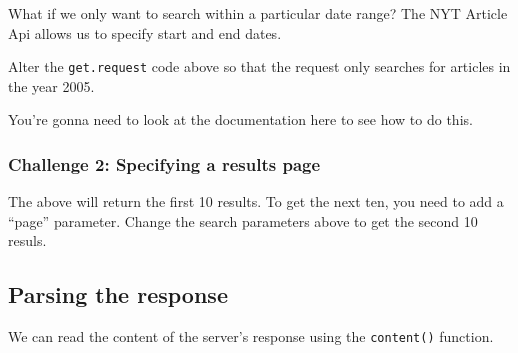 \documentclass[]{book}
\begin{document}
What if we only want to search within a particular date range? The NYT Article Api allows us to specify start and end dates.

Alter the \texttt{get.request} code above so that the request only searches for articles in the year 2005.

You're gonna need to look at the documentation here to see how to do this.

\hypertarget{challenge-2-specifying-a-results-page}{%
\subsubsection*{Challenge 2: Specifying a results page}\label{challenge-2-specifying-a-results-page}}

The above will return the first 10 results. To get the next ten, you need to add a ``page'' parameter. Change the search parameters above to get the second 10 resuls.

\hypertarget{parsing-the-response}{%
\subsection{Parsing the response}\label{parsing-the-response}}

We can read the content of the server's response using the \texttt{content()} function.
\end{document}
